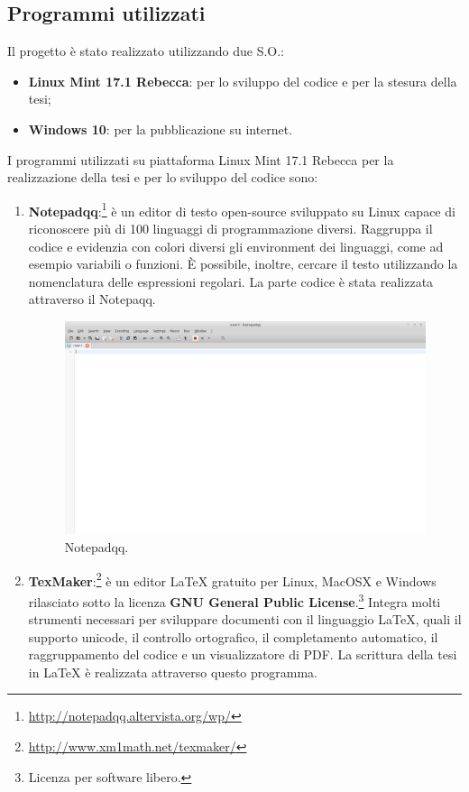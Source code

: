\documentclass[a4paper,11pt]{article}
\begin{document}
\subsection{Programmi utilizzati}
\label{sec:6.1}
Il progetto è stato realizzato utilizzando due S.O.:
\begin{itemize}
	\item \textbf{Linux Mint 17.1 Rebecca}: per lo sviluppo del codice e per la stesura della tesi;
	\item \textbf{Windows 10}: per la pubblicazione su internet.
\end{itemize}
I programmi utilizzati su piattaforma Linux Mint 17.1 Rebecca per la realizzazione della tesi e per lo sviluppo del codice sono:
\begin{enumerate}
	\item \textbf{Notepadqq}:\footnote{\url{http://notepadqq.altervista.org/wp/}} è un editor di testo open-source sviluppato su Linux capace di riconoscere più di 100 linguaggi di programmazione diversi. Raggruppa il codice e evidenzia con colori diversi gli environment dei linguaggi, come ad esempio variabili o funzioni.
È possibile, inoltre, cercare il testo utilizzando la nomenclatura delle espressioni regolari. 
La parte codice è stata realizzata attraverso il Notepaqq.
\begin{figure}[htpb]
	\centering
	\includegraphics[scale=0.30]{notepadqq.png}
	\caption{Notepadqq.}
	\label{fig:10}
\end{figure}
\newpage
		\item	\textbf{TexMaker}:\footnote{\url{http://www.xm1math.net/texmaker/}} è un editor LaTeX gratuito  per Linux, MacOSX e Windows rilasciato sotto la licenza \textbf{GNU General Public License}.\footnote{Licenza per software libero.}
Integra molti strumenti necessari per sviluppare documenti con il linguaggio LaTeX, quali il supporto unicode, il controllo ortografico, il completamento automatico, il raggruppamento del codice e un visualizzatore di PDF. La scrittura della tesi in LaTeX è realizzata attraverso questo programma.

\end{enumerate}
\end{document}
